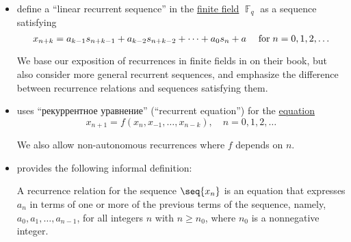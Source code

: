 \begin{remark}
\begin{itemize}
    \item {} define a \enquote{linear recurrent sequence} in the \hyperref[def:finite_field]{finite field} \( \BbbF_q \) as a sequence satisfying
    \begin{equation*}
      x_{n+k} = a_{k-1} s_{n+k-1} + a_{k-2} s_{n+k-2} + \cdots + a_0 s_n + a \quad\T{for} n = 0, 1, 2, \ldots
    \end{equation*}

    We base our exposition of recurrences in finite fields in  on their book, but also consider more general recurrent sequences, and emphasize the difference between recurrence relations and sequences satisfying them.

    \item {} uses \enquote{рекуррентное уравнение} (\enquote{recurrent equation}) for the \hyperref[def:equation]{equation}
    \begin{equation*}
      x_{n+1} = f(x_n, x_{-1}, \ldots, x_{n-k}), \quad n = 0, 1, 2, \ldots
    \end{equation*}

    We also allow non-autonomous recurrences where \( f \) depends on \( n \).

    \item {} provides the following informal definition:
    \begin{displayquote}
      A recurrence relation for the sequence \( \seq{ x_n } \) is an equation that expresses \( a_n \) in terms of one or more of the previous terms of the sequence, namely, \( a_0, a_1, \ldots, a_{n-1} \), for all integers \( n \) with \( n \geq n_0 \), where \( n_0 \) is a nonnegative integer.
    \end{displayquote}
  \end{itemize}
\end{remark}

